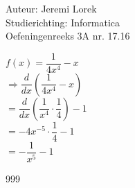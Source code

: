 \documentclass[a4paper]{article}
\begin{document}
  
\noindent \large Auteur: Jeremi Lorek\\
\noindent \large Studierichting: Informatica\\
\noindent \large Oefeningenreeks 3A nr. 17.16\\

\medskip
\normalsize

$f(x) = \dfrac{1}{4x^4} - x$ \\

$\Rightarrow \dfrac{d}{dx} \left( \dfrac{1}{4x^4} - x \right)$  \\

$= \dfrac{d}{dx} \left( \dfrac{1}{x^4} \cdot \dfrac{1}{4} \right) - 1$  \\

$= -4x^{-5} \cdot \dfrac{1}{4} - 1$  \\

$= -\dfrac{1}{x^5} - 1$  \\

\begin{thebibliography}{999}
\end{thebibliography}
\end{document}
